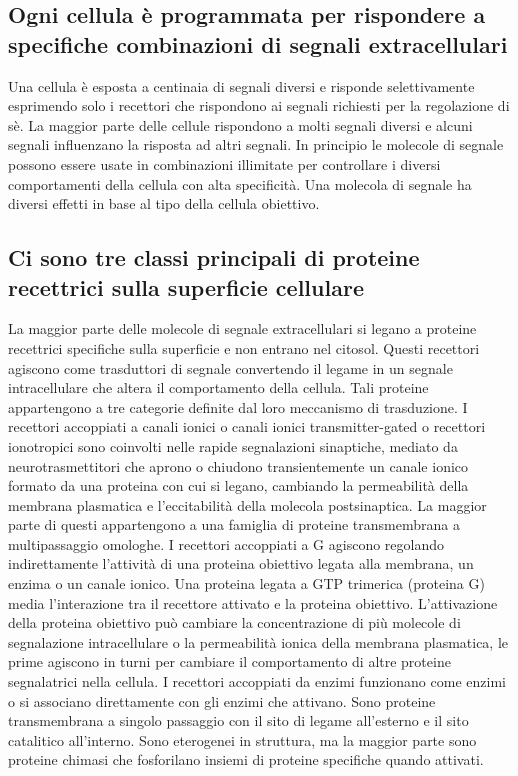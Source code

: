 \subsection{Ogni cellula \`e programmata per rispondere a specifiche combinazioni di segnali extracellulari}
Una cellula \`e esposta a centinaia di segnali diversi e risponde selettivamente esprimendo solo i recettori che rispondono ai segnali richiesti per la regolazione di s\`e. La maggior
parte delle cellule rispondono a molti segnali diversi e alcuni segnali influenzano la risposta ad altri segnali. In principio le molecole di segnale possono essere usate in
combinazioni illimitate per controllare i diversi comportamenti della cellula con alta specificit\`a. Una molecola di segnale ha diversi effetti in base al tipo della cellula
obiettivo. 
\subsection{Ci sono tre classi principali di proteine recettrici sulla superficie cellulare}
La maggior parte delle molecole di segnale extracellulari si legano a proteine recettrici specifiche sulla superficie e non entrano nel citosol. Questi recettori agiscono come
trasduttori di segnale convertendo il legame in un segnale intracellulare che altera il comportamento della cellula. Tali proteine appartengono a tre categorie definite dal loro
meccanismo di trasduzione. I recettori accoppiati a canali ionici o canali ionici transmitter-gated o recettori ionotropici sono coinvolti nelle rapide segnalazioni sinaptiche, mediato
da neurotrasmettitori che aprono o chiudono transientemente un canale ionico formato da una proteina con cui si legano, cambiando la permeabilit\`a della membrana plasmatica e
l'eccitabilit\`a della molecola postsinaptica. La maggior parte di questi appartengono a una famiglia di proteine transmembrana a multipassaggio omologhe. I recettori accoppiati a G 
agiscono regolando indirettamente l'attivit\`a di una proteina obiettivo legata alla membrana, un enzima o un canale ionico. Una proteina legata a GTP trimerica (proteina G) media
l'interazione tra il recettore attivato e la proteina obiettivo. L'attivazione della proteina obiettivo pu\`o cambiare la concentrazione di pi\`u molecole di segnalazione intracellulare
o la permeabilit\`a ionica della membrana plasmatica, le prime agiscono in turni per cambiare il comportamento di altre proteine segnalatrici nella cellula. I recettori accoppiati da
enzimi funzionano come enzimi o si associano direttamente con gli enzimi che attivano. Sono proteine transmembrana a singolo passaggio con il sito di legame all'esterno e il sito 
catalitico all'interno. Sono eterogenei in struttura, ma la maggior parte sono proteine chimasi che fosforilano insiemi di proteine specifiche quando attivati. 
